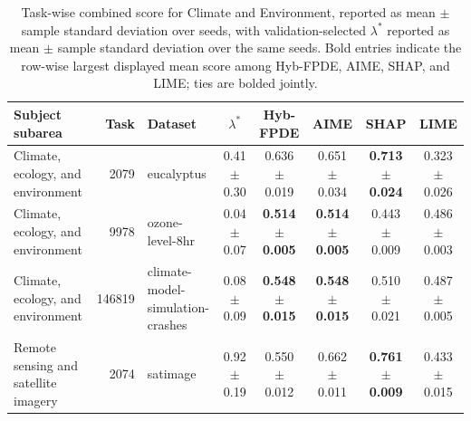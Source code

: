 \begin{table}[!tbp]
    \caption{Task-wise combined score for Climate and Environment, reported as mean $\pm$ sample standard deviation over seeds, with validation-selected $\lambda^*$ reported as mean $\pm$ sample standard deviation over the same seeds. Bold entries indicate the row-wise largest displayed mean score among Hyb-FPDE, AIME, SHAP, and LIME; ties are bolded jointly.}
    \label{tab:taskwise_combined_scores_sd_climate_environment}
    \centering
    \scriptsize
    \setlength{\tabcolsep}{3pt}
    \renewcommand{\arraystretch}{1.03}
    \begin{tabular}{lrlccccc}
        \toprule
        Subject subarea & Task & Dataset & $\lambda^*$ & Hyb-FPDE & AIME & SHAP & LIME  \\
        \midrule
        Climate, ecology, and environment & 2079 & eucalyptus & 0.41 $\pm$ 0.30 & 0.636 $\pm$ 0.019 & 0.651 $\pm$ 0.034 & \textbf{0.713 $\pm$ 0.024} & 0.323 $\pm$ 0.026 \\
        Climate, ecology, and environment & 9978 & ozone-level-8hr & 0.04 $\pm$ 0.07 & \textbf{0.514 $\pm$ 0.005} & \textbf{0.514 $\pm$ 0.005} & 0.443 $\pm$ 0.009 & 0.486 $\pm$ 0.003 \\
        Climate, ecology, and environment & 146819 & climate-model-simulation-crashes & 0.08 $\pm$ 0.09 & \textbf{0.548 $\pm$ 0.015} & \textbf{0.548 $\pm$ 0.015} & 0.510 $\pm$ 0.021 & 0.487 $\pm$ 0.005 \\
        Remote sensing and satellite imagery & 2074 & satimage & 0.92 $\pm$ 0.19 & 0.550 $\pm$ 0.012 & 0.662 $\pm$ 0.011 & \textbf{0.761 $\pm$ 0.009} & 0.433 $\pm$ 0.015 \\
        \bottomrule
    \end{tabular}%
\end{table}

